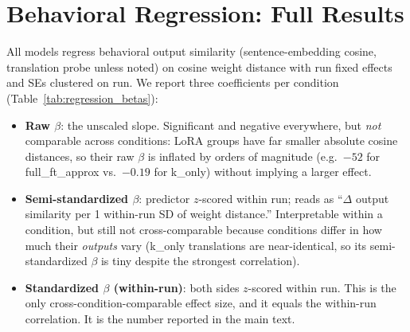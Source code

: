\documentclass{article}
\theoremstyle{definition}
\theoremstyle{plain}
\begin{document}
\section{Behavioral Regression: Full Results}
\label{app:regression}

All models regress behavioral output similarity (sentence-embedding cosine, translation probe
unless noted) on cosine weight distance with run fixed effects and SEs clustered on run. We report
three coefficients per condition (Table~\ref{tab:regression_betas}):
\begin{itemize}
  \item \textbf{Raw $\beta$}: the unscaled slope. Significant and negative everywhere, but
    \emph{not} comparable across conditions: LoRA groups have far smaller absolute cosine distances,
    so their raw $\beta$ is inflated by orders of magnitude (e.g.\ $-52$ for full\_ft\_approx vs.\
    $-0.19$ for k\_only) without implying a larger effect.
  \item \textbf{Semi-standardized $\beta$}: predictor $z$-scored within run; reads as ``$\Delta$
    output similarity per 1 within-run SD of weight distance.'' Interpretable within a condition,
    but still not cross-comparable because conditions differ in how much their \emph{outputs} vary
    (k\_only translations are near-identical, so its semi-standardized $\beta$ is tiny despite the
    strongest correlation).
  \item \textbf{Standardized $\beta$ (within-run)}: both sides $z$-scored within run. This is the
    only cross-condition-comparable effect size, and it equals the within-run correlation. It is the
    number reported in the main text.
\end{itemize}
\end{document}
